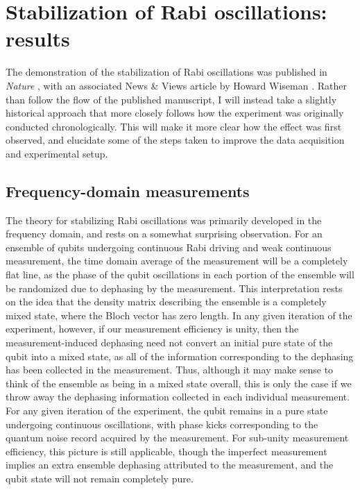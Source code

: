 
\chapter{Stabilization of Rabi oscillations: results}
\label{c:qfb_results}

The demonstration of the stabilization of Rabi oscillations was published in \textit{Nature} \cite{vijay_stabilizing_2012}, with an associated News \& Views article by Howard Wiseman \cite{Wiseman2012}.  Rather than follow the flow of the published manuscript, I will instead take a slightly historical approach that more closely follows how the experiment was originally conducted chronologically.  This will make it more clear how the effect was first observed, and elucidate some of the steps taken to improve the data acquisition and experimental setup. 

\section{Frequency-domain measurements}

The theory for stabilizing Rabi oscillations was primarily developed in the frequency domain, and rests on a somewhat surprising observation.  For an ensemble of qubits undergoing continuous Rabi driving and weak continuous measurement, the time domain average of the measurement will be a completely flat line, as the phase of the qubit oscillations in each portion of the ensemble will be randomized due to dephasing by the measurement.  This interpretation rests on the idea that the density matrix describing the ensemble is a completely mixed state, where the Bloch vector has zero length.  In any given iteration of the experiment, however, if our measurement efficiency is unity, then the measurement-induced dephasing need not convert an initial pure state of the qubit into a mixed state, as all of the information corresponding to the dephasing has been collected in the measurement.  Thus, although it may make sense to think of the ensemble as being in a mixed state overall, this is only the case if we throw away the dephasing information collected in each individual measurement.  For any given iteration of the experiment, the qubit remains in a pure state undergoing continuous oscillations, with phase kicks corresponding to the quantum noise record acquired by the measurement.  For sub-unity measurement efficiency, this picture is still applicable, though the imperfect measurement implies an extra ensemble dephasing attributed to the measurement, and the qubit state will not remain completely pure.

